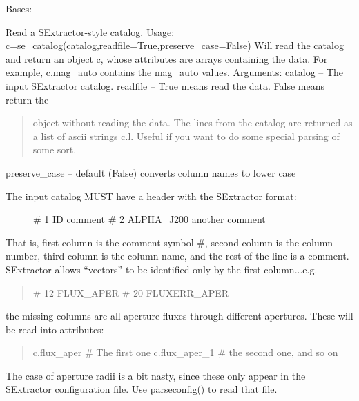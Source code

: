 \documentclass[letterpaper,10pt,english]{sphinxmanual}
\begin{document}

\begin{fulllineitems}
\label{SamPy.smnIO:SamPy.smnIO.sextutils.se_catalog}
Bases: 

Read a SExtractor-style catalog. 
Usage: c=se\_catalog(catalog,readfile=True,preserve\_case=False)
Will read the catalog and return an object c, whose attributes are 
arrays containing the data. For example, c.mag\_auto contains the 
mag\_auto values.
Arguments:
catalog -- The input SExtractor catalog. 
readfile -- True means read the data. False means return the
\begin{quote}

object without reading the data. The lines from the catalog
are returned as a list of ascii strings c.l. Useful if you want
to do some special parsing of some sort.
\end{quote}

preserve\_case -- default (False) converts column names to lower case
\begin{description}
\item[{The input catalog MUST have a header with the SExtractor format:}] \leavevmode
\# 1 ID comment
\# 2 ALPHA\_J200 another comment

\end{description}

That is, first column is the comment symbol \#, second column is
the column number, third column is the column name, and the rest
of the line is a comment. SExtractor allows ``vectors'' to be identified
only by the first column...e.g.
\begin{quote}

\# 12 FLUX\_APER
\# 20 FLUXERR\_APER
\end{quote}

the missing columns are all aperture fluxes through different
apertures. These will be read into attributes:
\begin{quote}

c.flux\_aper   \# The first one
c.flux\_aper\_1 \# the second one, and so on
\end{quote}

The case of aperture radii is a bit nasty, since these only
appear in the SExtractor configuration file. Use parseconfig()
to read that file.


\end{fulllineitems}
\end{document}
